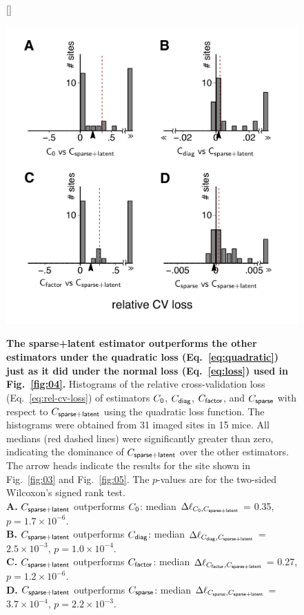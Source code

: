 \documentclass[10pt]{article}
\begin{document}
\begin{figure}[!ht]
[\FBwidth]
{\caption{{\bf The sparse+latent estimator outperforms the other estimators under the quadratic loss (Eq.~\ref{eq:quadratic}) just as it did under the normal loss (Eq.~\ref{eq:loss}) used in Fig.~\ref{fig:04}.}
    Histograms of the relative cross-validation loss (Eq.~\ref{eq:rel-cv-loss}) of estimators $C_{\sf 0}$, $C_{\sf diag}$, $C_{\sf factor}$, and $C_{\sf sparse}$ with respect to $C_{\sf sparse+latent}$ using the quadratic loss function.
    The histograms were obtained from 31 imaged sites in 15 mice. 
    All medians (red dashed lines) were significantly greater than zero, indicating the dominance of $C_{\sf sparse+latent}$ over the other estimators. 
    The arrow heads indicate the results for the site shown in Fig.~\ref{fig:03} and Fig.~\ref{fig:05}.
    The $p$-values are for the two-sided Wilcoxon's signed rank test.
    \\{\bf A.} $C_{\sf sparse+latent}$ outperforms $C_{\sf 0}$: median $\Delta\ell_{C_{\sf 0},C_{\sf sparse+latent}}$ = 0.35, $p=1.7\times 10^{-6}$.
    \\{\bf B.} $C_{\sf sparse+latent}$ outperforms $C_{\sf diag}$: median $\Delta\ell_{C_{\sf diag},C_{\sf sparse+latent}}$ = $2.5\times 10^{-3}$, $p=1.0\times 10^{-4}$.
    \\{\bf C.} $C_{\sf sparse+latent}$ outperforms $C_{\sf factor}$: median $\Delta\ell_{C_{\sf factor},C_{\sf sparse+latent}}$ = 0.27, $p=1.2\times 10^{-6}$.
    \\{\bf D.} $C_{\sf sparse+latent}$ outperforms $C_{\sf sparse}$: median $\Delta\ell_{C_{\sf sparse},C_{\sf sparse+latent}}$ = $3.7\times 10^{-4}$, $p=2.2\times 10^{-3}$.
}
\label{supp:02}}
{\includegraphics{./figures/Figure-Supp02.pdf}}
\end{figure}
\end{document}
